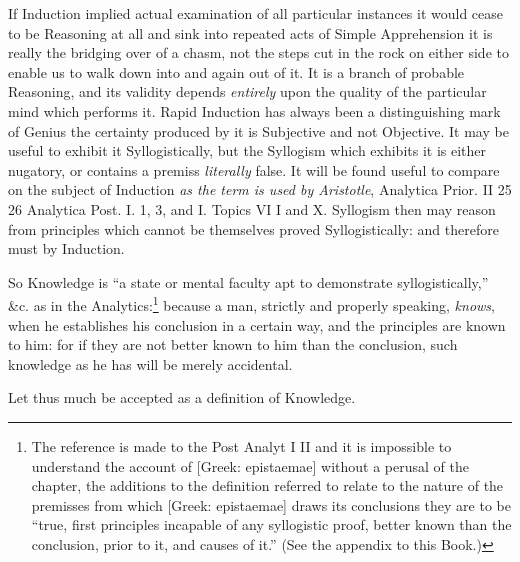 {If Induction implied actual examination of all particular instances it would
cease to be Reasoning at all and sink into repeated acts of Simple Apprehension
it is really the bridging over of a chasm, not the steps cut in the rock on
either side to enable us to walk down into and again out of it. It is a branch
of probable Reasoning, and its validity depends \emph{entirely} upon the
quality of the particular mind which performs it. Rapid Induction has always
been a distinguishing mark of Genius the certainty produced by it is Subjective
and not Objective. It may be useful to exhibit it Syllogistically, but the
Syllogism which exhibits it is either nugatory, or contains a premiss
\emph{literally} false. It will be found useful to compare on the subject of
Induction \emph{as the term is used by Aristotle}, Analytica Prior. II 25 26
Analytica Post. I. 1, 3, and I. Topics VI I and X.}
Syllogism then may reason from principles which cannot be themselves proved
Syllogistically: and therefore must by Induction.

So Knowledge is “a state or mental faculty apt to demonstrate
syllogistically,” \&c. as in the Analytics:\footnote{The reference is made to the Post Analyt I II and it is impossible to
understand the account of [Greek: epistaemae] without a perusal of the chapter,
the additions to the definition referred to relate to the nature of the
premisses from which [Greek: epistaemae] draws its conclusions they are to be
“true, first principles incapable of any syllogistic proof, better known
than the conclusion, prior to it, and causes of it.” (See the appendix to
this Book.)}
because a man, strictly and properly speaking, \emph{knows}, when he
establishes his conclusion in a certain way, and the principles are known to
him: for if they are not better known to him than the conclusion, such
knowledge as he has will be merely accidental.

Let thus much be accepted as a definition of Knowledge.


